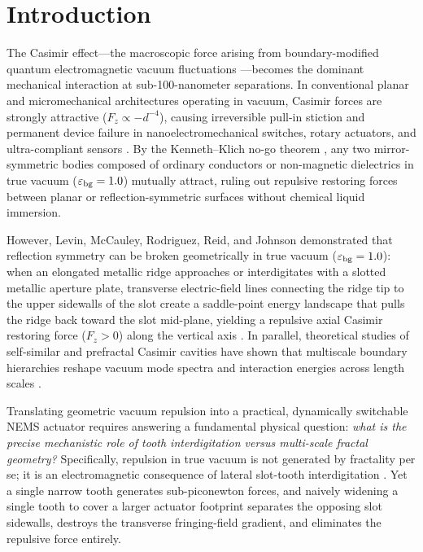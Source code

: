 \documentclass[11pt,letterpaper]{article}
\begin{document}
\newpage

\section{Introduction}
\label{sec:introduction}

The Casimir effect---the macroscopic force arising from boundary-modified quantum electromagnetic vacuum fluctuations \cite{casimir1948,bordag2009}---becomes the dominant mechanical interaction at sub-100-nanometer separations. In conventional planar and micromechanical architectures operating in vacuum, Casimir forces are strongly attractive ($F_z \propto -d^{-4}$), causing irreversible pull-in stiction and permanent device failure in nanoelectromechanical switches, rotary actuators, and ultra-compliant sensors \cite{rodriguez2011}. By the Kenneth--Klich no-go theorem \cite{kennethklich2006}, any two mirror-symmetric bodies composed of ordinary conductors or non-magnetic dielectrics in true vacuum ($\varepsilon_{\rm bg}=1.0$) mutually attract, ruling out repulsive restoring forces between planar or reflection-symmetric surfaces without chemical liquid immersion.

However, Levin, McCauley, Rodriguez, Reid, and Johnson demonstrated that reflection symmetry can be broken geometrically in true vacuum ($\varepsilon_{\rm bg}=1.0$): when an elongated metallic ridge approaches or interdigitates with a slotted metallic aperture plate, transverse electric-field lines connecting the ridge tip to the upper sidewalls of the slot create a saddle-point energy landscape that pulls the ridge back toward the slot mid-plane, yielding a repulsive axial Casimir restoring force ($F_z > 0$) along the vertical axis \cite{levin2010,rodriguez2011}. In parallel, theoretical studies of self-similar and prefractal Casimir cavities have shown that multiscale boundary hierarchies reshape vacuum mode spectra and interaction energies across length scales \cite{shajesh2016,shajesh2017,gordon2026prd}.

Translating geometric vacuum repulsion into a practical, dynamically switchable NEMS actuator requires answering a fundamental physical question: \emph{what is the precise mechanistic role of tooth interdigitation versus multi-scale fractal geometry?} Specifically, repulsion in true vacuum is not generated by fractality per se; it is an electromagnetic consequence of lateral slot-tooth interdigitation \cite{levin2010}. Yet a single narrow tooth generates sub-piconewton forces, and naively widening a single tooth to cover a larger actuator footprint separates the opposing slot sidewalls, destroys the transverse fringing-field gradient, and eliminates the repulsive force entirely.
\end{document}

